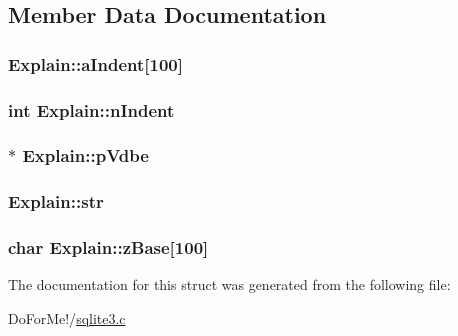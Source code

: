 \subsection{Member Data Documentation}
\hypertarget{struct_explain_ac80869acc619d982c3246134678b4d6e}{
\subsubsection[{a\-Indent}]{ Explain\-::a\-Indent\mbox{[}100\mbox{]}}}\label{struct_explain_ac80869acc619d982c3246134678b4d6e}
\hypertarget{struct_explain_a5420e5a4c88050c6536328612fcad2b7}{
\subsubsection[{n\-Indent}]{\setlength{\rightskip}{0pt plus 5cm}int Explain\-::n\-Indent}}\label{struct_explain_a5420e5a4c88050c6536328612fcad2b7}
\hypertarget{struct_explain_a5b40aff5e9132f568c01f5790c69cc89}{
\subsubsection[{p\-Vdbe}]{$\ast$ Explain\-::p\-Vdbe}}\label{struct_explain_a5b40aff5e9132f568c01f5790c69cc89}
\hypertarget{struct_explain_af92c731731b19685b567d29493f1e83e}{
\subsubsection[{str}]{ Explain\-::str}}\label{struct_explain_af92c731731b19685b567d29493f1e83e}
\hypertarget{struct_explain_a1ac782f9829311d6b85edc1707ef8d41}{
\subsubsection[{z\-Base}]{\setlength{\rightskip}{0pt plus 5cm}char Explain\-::z\-Base\mbox{[}100\mbox{]}}}\label{struct_explain_a1ac782f9829311d6b85edc1707ef8d41}


The documentation for this struct was generated from the following file\-:\begin{DoxyCompactItemize}
\item 
Do\-For\-Me!/\hyperlink{sqlite3_8c}{sqlite3.\-c}\end{DoxyCompactItemize}
